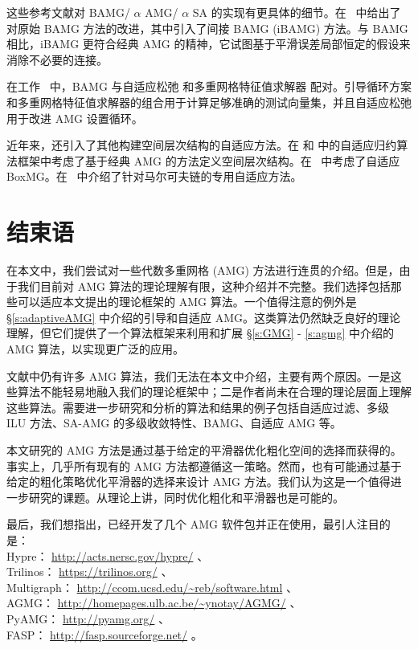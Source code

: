 \documentclass[12pt]{acta_2011xz}
\begin{document}
这些参考文献对 BAMG/   $\alpha$    AMG/   $\alpha$    SA 的实现有更具体的细节。在~   \cite{Manteuffel.T;McCormick.S;Park.M;Ruge.J.2010b}    中给出了对原始 BAMG 方法的改进，其中引入了间接 BAMG (iBAMG) 方法。与 BAMG 相比，iBAMG 更符合经典 AMG 的精神，它试图基于平滑误差局部恒定的假设来消除不必要的连接。  

在工作~    \cite{Brandt.A;Brannick.J;Kahl.K;Livshits.I.2011a}    中，BAMG 与自适应松弛
   \cite{Brandt.A.2000a,Kahl.K.2009a}    和多重网格特征值求解器
   \cite{Brezina.M;Manteuffel.T;McCormick.S;Ruge.J;Sanders.G;Vassilevski.P.2008a}    配对。引导循环方案
   \cite{Livshits.I.2008a,Kahl.K.2009a}    和多重网格特征值求解器的组合用于计算足够准确的测试向量集，并且自适应松弛用于改进 AMG 设置循环。  

近年来，还引入了其他构建空间层次结构的自适应方法。在
   \cite{2010BrannickJ_FrommerA_KahlK_MacLachlanS_ZikatanovL-aa}    和
   \cite{2006MacLachlanS_ManteuffelT_McCormickS-aa}    中的自适应归约算法框架中考虑了基于经典 AMG 的方法定义空间层次结构。在~   \cite{2012MacLachlanS_MoultonJ_ChartierT-aa}    中考虑了自适应 BoxMG。在~   \cite{2011De-SterckH_MillerK_TreisterE_YavnehI-aa}    中介绍了针对马尔可夫链的专用自适应方法。  

   \section{结束语  }       \label{s:conclusion}    在本文中，我们尝试对一些代数多重网格 (AMG) 方法进行连贯的介绍。但是，由于我们目前对 AMG 算法的理论理解有限，这种介绍并不完整。我们选择包括那些可以适应本文提出的理论框架的 AMG 算法。一个值得注意的例外是    \S       \ref{s:adaptiveAMG}    中介绍的引导和自适应 AMG。这类算法仍然缺乏良好的理论理解，但它们提供了一个算法框架来利用和扩展    \S       \ref{s:GMG}    -    \ref{s:agmg}    中介绍的 AMG 算法，以实现更广泛的应用。  

文献中仍有许多 AMG 算法，我们无法在本文中介绍，主要有两个原因。一是这些算法不能轻易地融入我们的理论框架中；二是作者尚未在合理的理论层面上理解这些算法。需要进一步研究和分析的算法和结果的例子包括自适应过滤、多级 ILU 方法、SA-AMG 的多级收敛特性、BAMG、自适应 AMG 等。  

本文研究的 AMG 方法是通过基于给定的平滑器优化粗化空间的选择而获得的。事实上，几乎所有现有的 AMG 方法都遵循这一策略。然而，也有可能通过基于给定的粗化策略优化平滑器的选择来设计 AMG 方法。我们认为这是一个值得进一步研究的课题。从理论上讲，同时优化粗化和平滑器也是可能的。  

最后，我们想指出，已经开发了几个 AMG 软件包并正在使用，最引人注目的是：\\ Hypre：   \url{http://acts.nersc.gov/hypre/}   、\\ Trilinos：   \url{https://trilinos.org/}   、\\ Multigraph：   \url{http://ccom.ucsd.edu/~reb/software.html}   、\\ AGMG：   \url{http://homepages.ulb.ac.be/~ynotay/AGMG/}   、\\ PyAMG：   \url{http://pyamg.org/}   、\\ FASP：   \url{http://fasp.sourceforge.net/}   。  
\end{document}
